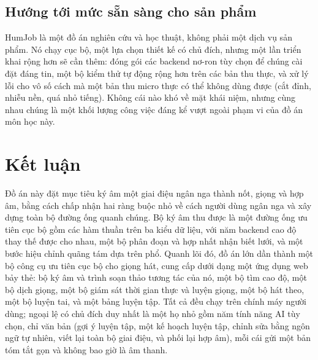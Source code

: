\documentclass[12pt,a4paper]{article}
\begin{document}
\subsection{Hướng tới mức sẵn sàng cho sản phẩm}

HumJob là một đồ án nghiên cứu và học thuật, không phải một dịch vụ sản phẩm. Nó
chạy cục bộ, một lựa chọn thiết kế có chủ đích, nhưng một lần triển khai rộng hơn sẽ
cần thêm: đóng gói các backend nơ-ron tùy chọn để chúng cài đặt đáng tin, một bộ
kiểm thử tự động rộng hơn trên các bản thu thực, và xử lý lỗi cho vô số cách mà một
bản thu micro thực có thể không dùng được (cắt đỉnh, nhiễu nền, quá nhỏ tiếng).
Không cái nào khó về mặt khái niệm, nhưng cùng nhau chúng là một khối lượng công việc
đáng kể vượt ngoài phạm vi của đồ án môn học này.

\section{Kết luận}

Đồ án này đặt mục tiêu ký âm một giai điệu ngân nga thành nốt, giọng và hợp âm, bằng
cách chấp nhận hai ràng buộc nhỏ về cách người dùng ngân nga và xây dựng toàn bộ
đường ống quanh chúng. Bộ ký âm thu được là một đường ống ưu tiên cục bộ gồm các hàm
thuần trên ba kiểu dữ liệu, với năm backend cao độ thay thế được cho nhau, một bộ
phân đoạn và hợp nhất nhận biết lưới, và một bước hiệu chỉnh quãng tám dựa trên phổ.
Quanh lõi đó, đồ án lớn dần thành một bộ công cụ ưu tiên cục bộ cho giọng hát, cung
cấp dưới dạng một ứng dụng web bảy thẻ: bộ ký âm và trình soạn thảo tương tác của
nó, một bộ tìm cao độ, một bộ dịch giọng, một bộ giám sát thời gian thực và luyện
giọng, một bộ hát theo, một bộ luyện tai, và một bảng luyện tập. Tất cả đều chạy
trên chính máy người dùng; ngoại lệ có chủ đích duy nhất là một họ nhỏ gồm năm tính
năng AI tùy chọn, chỉ văn bản (gợi ý luyện tập, một kế hoạch luyện tập, chỉnh sửa
bằng ngôn ngữ tự nhiên, viết lại toàn bộ giai điệu, và phối lại hợp âm), mỗi cái gửi
một bản tóm tắt gọn và không bao giờ là âm thanh.
\end{document}
